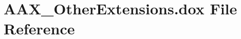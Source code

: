 \hypertarget{a00341}{}\section{A\+A\+X\+\_\+\+Other\+Extensions.\+dox File Reference}
\label{a00341}
